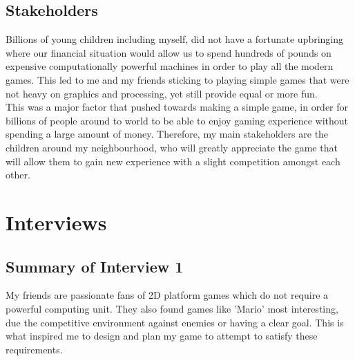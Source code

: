 \documentclass[12pt]{article}
\begin{document}
\subsection{Stakeholders}
Billions of young children including myself, did not have a fortunate upbringing where our financial situation would allow us to spend hundreds of pounds on expensive computationally powerful machines in order to play all the modern games. This led to me and my friends sticking to playing simple games that were not heavy on graphics and processing, yet still provide equal or more fun.\\

This was a major factor that pushed towards making a simple game, in order for billions of people around to world to be able to enjoy gaming experience without spending a large amount of money. Therefore, my main stakeholders are the children around my neighbourhood, who will greatly appreciate the game that will allow them to gain new experience with a slight competition amongst each other.


\section{Interviews}
\subsection{Summary of Interview 1}
My friends are passionate fans of 2D platform games which do not require a powerful computing unit. They also found games like 'Mario' most interesting, due the competitive environment against enemies or having a clear goal. This is what inspired me to design and plan my game to attempt to satisfy these requirements.


\newpage
\end{document}
